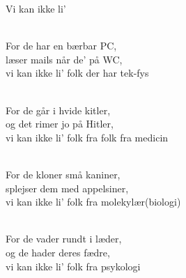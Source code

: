 \begin{song}{Vi kan ikke li'}
\begin{SBVerse}
    \\
    For de har en bærbar PC,\\
    læser mails når de' på WC,\\
    vi kan ikke li' folk der har tek-fys
 \end{SBVerse}



 \begin{SBVerse}
    \\
    For de går i hvide kitler,\\
    og det rimer jo på Hitler,\\
    vi kan ikke li' folk fra folk fra medicin
  \end{SBVerse}

 \begin{SBVerse}
    \\
    For de kloner små kaniner,\\
    splejser dem med appelsiner,\\
    vi kan ikke li' folk fra molekylær(biologi)
  \end{SBVerse}

 \begin{SBVerse}
    \\
    For de vader rundt i læder,\\
    og de hader deres fædre,\\
    vi kan ikke li' folk fra psykologi
  \end{SBVerse}


\end{song}
